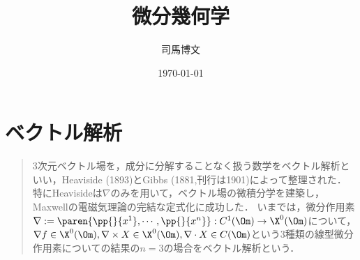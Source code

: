 \documentclass[uplatex,dvipdfmx]{jsreport}
\title{微分幾何学}
\author{司馬博文}
\date{\today}
\begin{document}
\tableofcontents

\chapter{ベクトル解析}

\begin{quotation}
    3次元ベクトル場を，成分に分解することなく扱う数学をベクトル解析といい，Heaviside (1893)とGibbs (1881,刊行は1901)によって整理された．
    特にHeavisideは$\nabla$のみを用いて，ベクトル場の微積分学を建築し，Maxwellの電磁気理論の完結な定式化に成功した．
    いまでは，微分作用素$\nabla:=\paren{\pp{}{x^1},\cdots,\pp{}{x^n}}:C^1(\Om)\to\X^0(\Om)$について，$\nabla f\in\X^0(\Om),\nabla\times X\in\X^0(\Om),\nabla\cdot X\in C(\Om)$という3種類の線型微分作用素についての結果の$n=3$の場合をベクトル解析という．
\end{quotation}
\end{document}
